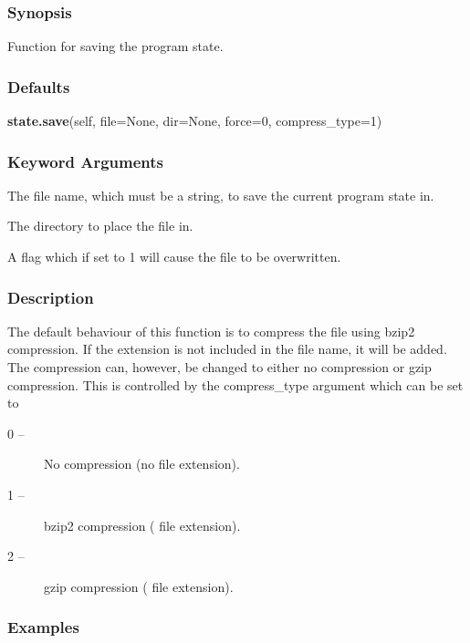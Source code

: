 \subsubsection{Synopsis}

Function for saving the program state.

\subsubsection{Defaults}

\textsf{\textbf{state.save}(self, file=None, dir=None, force=0, compress\_type=1)}


\subsubsection{Keyword Arguments}


  The file name, which must be a string, to save the current program state in.

  The directory to place the file in.

  A flag which if set to 1 will cause the file to be overwritten.

\subsubsection{Description}

The default behaviour of this function is to compress the file using bzip2  compression.   If
the extension 
 is not included in the file name, it will be added.  The compression 
can, however, be changed to either no compression  or gzip  compression.   This is controlled
by the compress\_type argument which can be set to

\begin{description}
\item[    0 --]   No compression  (no file extension).
\item[    1 --]   bzip2  compression  (
 file extension).
\item[    2 --]   gzip  compression  (
 file extension).
\end{description}


\subsubsection{Examples}

